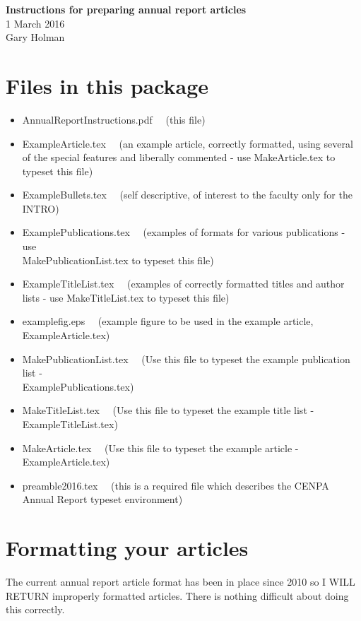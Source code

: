 \documentclass[twoside,11pt]{article}
\begin{document}
\begin{centering}
\Large{\bf Instructions for preparing annual report articles}\\
1 March 2016\\
Gary Holman\\
\end{centering}

\section{Files in this package}

\begin{itemize}
\item AnnualReportInstructions.pdf~~ (this file)
\item ExampleArticle.tex~~ (an example article, correctly formatted, using several of the special features and liberally commented - use MakeArticle.tex to typeset this file)
\item ExampleBullets.tex~~ (self descriptive, of interest to the faculty only for the INTRO)
\item ExamplePublications.tex~~  (examples of formats for various publications - use \\  MakePublicationList.tex to typeset this file)
\item ExampleTitleList.tex~~  (examples of correctly formatted titles and author lists - use MakeTitleList.tex to typeset this file)
\item examplefig.eps~~  (example figure to be used in the example article, ExampleArticle.tex)
\item MakePublicationList.tex~~  (Use this file to typeset the example publication list - \\  ExamplePublications.tex)
\item MakeTitleList.tex~~  (Use this file to typeset the example title list - ExampleTitleList.tex)
\item MakeArticle.tex~~  (Use this file to typeset the example article - ExampleArticle.tex)
\item preamble2016.tex~~ (this is a required file which describes the CENPA Annual Report typeset environment)
\end{itemize}

\section{Formatting your articles}

\noindent
The current annual report article format has been in place since 2010 so I WILL RETURN improperly formatted articles. There is nothing difficult about doing this correctly.
\end{document}
